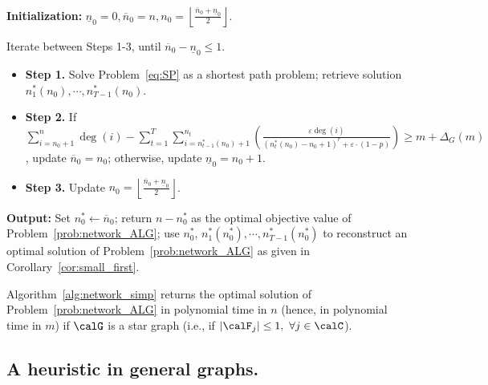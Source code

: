 \documentclass[blindrev]{informs3noheader}
\begin{document}
\begin{algorithm} [h!]
\caption{Algorithm to solve Problem~\eqref{prob:network_ALG} in star graph $\calG$: \texttt{STAR}($\calG$).}\small
\label{alg:network_simp}
\begin{algorithmic}[1]
\item \textbf{Initialization:} $\underline{n}_0=0,\overline{n}_0=n, n_0=\left\lfloor\frac{\overline{n}_0+\underline{n}_0}{2}\right\rfloor$.
\item Iterate between Steps 1-3, until $\overline n_0-\underline n_0\leq 1$.
\begin{itemize}
\item[] \textbf{Step 1.} Solve Problem~\eqref{eq:SP} as a shortest path problem; retrieve solution $n_1^*(n_0),\cdots, n_{T-1}^*(n_0)$.
\item[] \textbf{Step 2.} If $\displaystyle\sum_{i=n_0+1}^n \deg(i)-\sum_{t=1}^T\sum_{i=n_{t-1}^*(n_0)+1}^{n_t}\left(\frac{\varepsilon \deg(i)}{\left(n_{t}^*(n_0)-n_0 +1\right)^r+\varepsilon\cdot(1-p)}\right)\geq m+\Delta_G(m)$, update $\overline{n}_0 = n_0$; otherwise, update $\underline{n}_0 = n_0+1$.
\item[] \textbf{Step 3.} Update $n_0 = \left\lfloor\frac{\overline{n}_0 + \underline{n}_0}{2}\right\rfloor$.
\end{itemize}
\item \textbf{Output:} Set $n_0^*\gets\overline{n}_0$; return $n-n_0^*$ as the optimal objective value of Problem~\eqref{prob:network_ALG}; use $n_0^*$, $n_1^*(n_0^*),\cdots, n_{T-1}^*(n_0^*)$ to reconstruct an optimal solution of Problem~\eqref{prob:network_ALG} as given in Corollary~\ref{cor:small_first}.
\end{algorithmic}
\end{algorithm}

\begin{proposition}\label{prop:exact}
Algorithm~\ref{alg:network_simp} returns the optimal solution of Problem~\eqref{prob:network_ALG} in polynomial time in $n$ (hence, in polynomial time in $m$) if $\calG$ is a star graph (i.e., if $|\calF_j|\leq1,\ \forall j\in\calC$).
\end{proposition}

\subsection{A heuristic in general graphs.}
\end{document}
